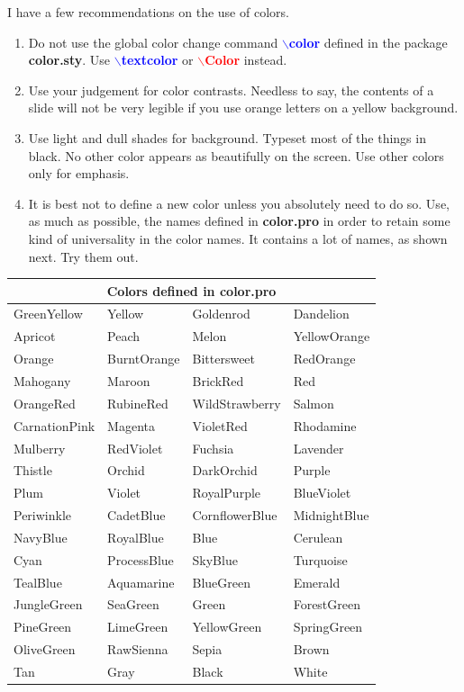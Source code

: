 \documentclass[12pt]{article}
\def\ecomm#1{{\textcolor{blue}{$\backslash${\bf #1}}}}
\def\comm#1{{\textcolor{red}{$\backslash${\bf #1}}}}
\def\file#1{\textcolor{darkpurple}{\bf #1}}
\begin{document}
I have a few recommendations on the use of colors.
\begin{enumerate}
%
\item Do not use the global color change command \ecomm{color} defined
in the package \file{color.sty}.  Use \ecomm{textcolor} or
\comm{Color} instead.

\item Use your judgement for color contrasts.  Needless to say, the
contents of a slide will not be very legible if you use orange letters
on a yellow background.

\item Use light and dull shades for background.  Typeset most of the
things in black.  No other color appears as beautifully on the screen.
Use other colors only for emphasis.

\item It is best not to define a new color unless you absolutely need
to do so.  Use, as much as possible, the names defined in
\file{color.pro} in order to retain some kind of universality in the
color names.  It contains a lot of names, as shown next.  Try them
out.

\end{enumerate}

\endslide
\beginslide

\begin{center}
\bf
\begin{tabular}{llll}
\hline
\multicolumn{4}{c}{Colors defined in \file{color.pro}} \\
\hline
GreenYellow & Yellow & Goldenrod & Dandelion \\ 
Apricot & Peach & Melon & YellowOrange \\ 
Orange & BurntOrange & Bittersweet & RedOrange \\ 
Mahogany & Maroon & BrickRed & Red \\ 
OrangeRed & RubineRed & WildStrawberry & Salmon \\ 
CarnationPink & Magenta & VioletRed & Rhodamine \\ 
Mulberry & RedViolet & Fuchsia & Lavender \\ 
Thistle & Orchid & DarkOrchid & Purple \\ 
Plum & Violet & RoyalPurple & BlueViolet \\ 
Periwinkle & CadetBlue & CornflowerBlue & MidnightBlue \\ 
NavyBlue & RoyalBlue & Blue & Cerulean \\ 
Cyan & ProcessBlue & SkyBlue & Turquoise \\ 
TealBlue & Aquamarine & BlueGreen & Emerald \\ 
JungleGreen & SeaGreen & Green & ForestGreen \\ 
PineGreen & LimeGreen & YellowGreen & SpringGreen \\ 
OliveGreen & RawSienna & Sepia & Brown \\ 
Tan & Gray & Black & White \\
\hline
\end{tabular} 
\end{center}
\endslide  
\end{document}
